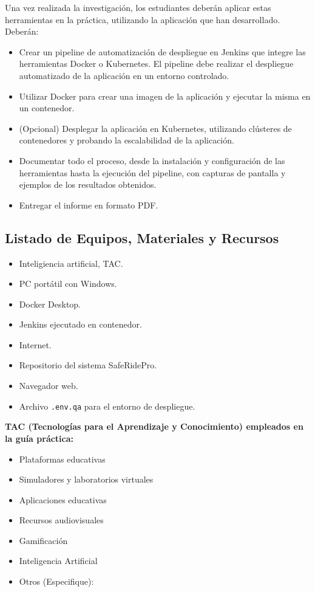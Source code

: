 \documentclass{article}
\newcommand{\checkedbox}{\stackinset{c}{0pt}{c}{0pt}{\checkmark}{$\square$}}
\begin{document}
Una vez realizada la investigación, los estudiantes deberán aplicar estas herramientas en la práctica, utilizando la aplicación que han desarrollado. Deberán:

\begin{itemize}
    \item Crear un pipeline de automatización de despliegue en Jenkins que integre las herramientas Docker o Kubernetes. El pipeline debe realizar el despliegue automatizado de la aplicación en un entorno controlado.
    \item Utilizar Docker para crear una imagen de la aplicación y ejecutar la misma en un contenedor.
    \item (Opcional) Desplegar la aplicación en Kubernetes, utilizando clústeres de contenedores y probando la escalabilidad de la aplicación.
    \item Documentar todo el proceso, desde la instalación y configuración de las herramientas hasta la ejecución del pipeline, con capturas de pantalla y ejemplos de los resultados obtenidos.
    \item Entregar el informe en formato PDF.
\end{itemize}

\subsection{Listado de Equipos, Materiales y Recursos}
\begin{itemize}
    \item Inteligiencia artificial, TAC.
    \item PC portátil con Windows.
    \item Docker Desktop.
    \item Jenkins ejecutado en contenedor.
    \item Internet.
    \item Repositorio del sistema SafeRidePro.
    \item Navegador web.
    \item Archivo \texttt{.env.qa} para el entorno de despliegue.
\end{itemize}

\textbf{TAC (Tecnologías para el Aprendizaje y Conocimiento) empleados en la guía práctica:}
\begin{itemize}
    \item[\checkedbox] Plataformas educativas
    \item[$\square$] Simuladores y laboratorios virtuales
    \item[$\square$] Aplicaciones educativas
    \item[$\square$] Recursos audiovisuales
    \item[$\square$] Gamificación
    \item[\checkedbox] Inteligencia Artificial
    \item Otros (Especifique): \underline{\hspace{5cm}}
\end{itemize}
\end{document}

